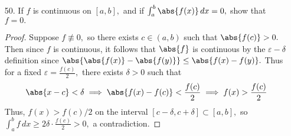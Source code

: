 \documentclass{article}
\begin{document}
\begin{itemize}
\begin{proof}
			Let $I=\int_a^b f\, d\alpha$ and let $\varepsilon>0.$ Since $f\in \mathcal R_\alpha[a, b],$ there exists a partition $P^*=\left\{ a=x_0<\cdots<x_n=b \right\}$ such that
			\begin{align*}
				\abs{S_\alpha(f, P, T)-I}<\varepsilon
			\end{align*}
			for all $P\supset P^*$ and all choices of points $T.$ Then $Q^*=\left\{ c=\varphi\inv(x_0)<\cdots<\varphi\inv(x_n)=d \right\}$ is a partition of $[c, d].$ Let $Q=\left\{ c=y_0<\cdots<y_m=d \right\}\supset Q^*$ and let $T$ be an arbitrary selection of points under $Q.$ We have
			\begin{align*}
				\abs{S_\beta(g, Q, T_1)-I} &= \abs{\sum_{i=1}^{m} g(t_i) \left[ \beta(y_i)-\beta(y_{i-1}) \right]-I} = \abs{\sum_{i=1}^{m} \alpha(\varphi(t_i)) \left[ \alpha(\varphi(y_i))-\alpha(\varphi(y_{i-1})) \right]-I}
			\end{align*}
			Now, since $Q$ is a partition of $[c, d]$ containing $Q^*,$ it follows that $\varphi(Q)=\left\{ \varphi(y):y\in Q \right\}$ is a partition of $[a, b]$ containing $P^*,$ and $\varphi(T)=\left\{ \varphi(t):t\in T \right\}$ is a selection of points, so from above, we have
			\begin{align*}
				\abs{S_\alpha(f, \varphi(Q), \varphi(T)) - I} &= \abs{\sum_{i=1}^{m}\alpha(\varphi(t_i))\left[ \alpha(\varphi(y_i))\alpha(\varphi(y_{i-1})) \right] - I} < \varepsilon
			\end{align*}
			and thus $g\in\mathcal R_\beta[c, d]$ and $\int_c^d g\, d\beta = I=\int_a^b f\, d\alpha.$
		\end{proof}

	\item[50.] If $f$ is continuous on $[a, b],$ and if $\int_a^b\abs{f(x)}\, dx=0,$ show that $f=0.$
		\begin{proof}
			Suppose $f\not\equiv0,$ so there exists $c\in (a, b)$ such that $\abs{f(c)}>0.$ Then since $f$ is continuous, it follows that $\abs{f}$ is continuous by the $\varepsilon-\delta$ definition since $\abs{\abs{f(x)}-\abs{f(y)}}\le \abs{f(x)-f(y)}.$ Thus for a fixed $\varepsilon=\frac{f(c)}{2},$ there exists $\delta>0$ such that
			\begin{align*}
				\abs{x-c} < \delta \implies \abs{f(x)-f(c)}<\frac{f(c)}{2} \implies f(x)>\frac{f(c)}{2}
			\end{align*}
			Thus, $f(x)>f(c)/2$ on the interval $[c-\delta, c+\delta]\subset [a, b],$ so $\int_a^b f\, dx \ge 2\delta\cdot \frac{f(c)}{2} > 0,$ a contradiction.
		\end{proof}
		
\end{itemize}
\end{document}
